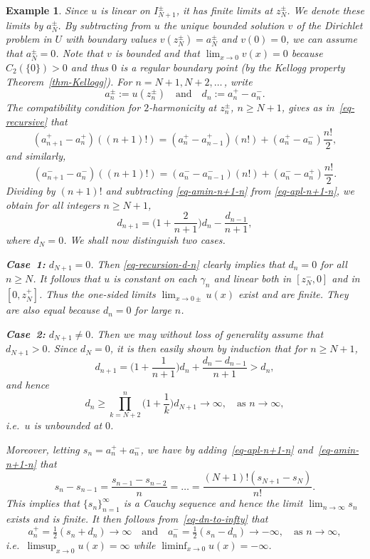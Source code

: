 \documentclass[a4paper,twoside]{article}
\theoremstyle{propositional}
\theoremstyle{descriptive}
\newtheorem{example}[thm]{Example}
\theoremstyle{remarkstyle}
\newcommand{\ga}{\gamma}
\newcommand{\zpm}{z^\pm}
\newcommand{\zpl}{z^+}
\newcommand{\zmin}{z^-}
\newcommand{\apm}{a^\pm}
\newcommand{\apl}{a^+}
\newcommand{\amin}{a^-}
\newcommand{\Ipm}{I^\pm}
\numberwithin{equation}{section}
\begin{document}
\begin{example}
Since $u$ is linear on $\Ipm_{N+1}$, it has finite limits at $\zpm_{N}$.
We denote these limits by $\apm_{N}$.
By subtracting from $u$ the unique bounded solution $v$ of the Dirichlet problem
in $U$ with boundary values $v(\zpm_{N})=\apm_{N}$ and $v(0)=0$,
we can assume that $\apm_{N}=0$.
Note that $v$ is bounded and that $\lim_{x\to0}v(x)=0$ because 
$C_2(\{0\})>0$ and thus $0$ is
a regular boundary point (by the Kellogg property 
Theorem~\ref{thm-Kellogg}).
For $n=N+1,N+2,\dots$\,, write 
\[
\apm_n:= u(\zpm_n) \quad \text{and} \quad d_n:= \apl_n-\amin_n.
\]
The compatibility condition for $2$-harmonicity at $\zpm_n$, $n\ge N+1$,
gives as in~\eqref{eq-recursive} that    
\begin{equation}    \label{eq-apl-n+1-n}
(\apl_{n+1}-\apl_n)((n+1)!)
    = (\apl_n-\apl_{n-1})(n!)  + (\apl_n-\amin_n) \frac{n!}{2},
\end{equation}
and similarly, 
\begin{equation}    \label{eq-amin-n+1-n}
(\amin_{n+1}-\amin_n)((n+1)!)
    = (\amin_n-\amin_{n-1})(n!) + (\amin_n-\apl_n) \frac{n!}{2}.
\end{equation}
Dividing by $(n+1)!$ and subtracting \eqref{eq-amin-n+1-n} from \eqref{eq-apl-n+1-n},
we obtain for  all integers $n\ge N+1$,
\begin{equation}   \label{eq-recursion-d-n}
d_{n+1} = \biggl( 1 +\frac{2}{n+1} \biggr) d_n - \frac{d_{n-1}}{n+1},
\end{equation}
where $d_{N}=0$.
We shall now distinguish two cases.

{\bf Case~1:}
$d_{N+1}=0$.
Then \eqref{eq-recursion-d-n} clearly implies that $d_n=0$
for all $n\ge N$. 
It follows that $u$ is constant on each $\ga_n$ and linear both
in $[\zmin_{N},0]$ and in $[0,\zpl_{N}]$.
Thus the one-sided limits $\lim_{x\to0\pm}u(x)$
exist and are finite. They are also equal because $d_n=0$ for large $n$.


{\bf Case~2:}
$d_{N+1} \ne 0$. Then
we may
without loss of generality assume that $d_{N+1}>0$.
Since $d_N=0$, it 
is then easily shown by induction that for $n\ge N+1$, 
\[
d_{n+1} = \biggl( 1 +\frac{1}{n+1} \biggr) d_n + \frac{d_n-d_{n-1}}{n+1} >
d_n,
\]
and hence 
\begin{equation}   \label{eq-dn-to-infty}
d_n \ge  \prod_{k=N+2}^n\biggl( 1 +\frac{1}{k} \biggr) d_{N+1} \to \infty,
\quad \text{as }n\to\infty,
\end{equation}
i.e.\ $u$ is unbounded at $0$.

Moreover, letting $s_n=\apl_n+\amin_n$, 
we have by adding~\eqref{eq-apl-n+1-n} and~\eqref{eq-amin-n+1-n} that
\[
s_n- s_{n-1} = \frac{s_{n-1}-s_{n-2}}{n} = 
\dots = \frac{(N+1)! (s_{N+1}-s_N)}{n!}.
\]
This implies that $\{s_n\}_{n=1}^\infty$ is a Cauchy sequence
and hence the limit $\lim_ {n\to\infty} s_n$ exists and is finite.
It then follows from~\eqref{eq-dn-to-infty} that
\[
\apl_n = \tfrac12 (s_n+d_n) \to\infty
\quad \text{and} \quad
\amin_n = \tfrac12 (s_n-d_n) \to -\infty,
\quad \text{as } n\to\infty,
\]
i.e.\ $\limsup_{x\to0} u(x)=\infty$
while $\liminf_{x\to0} u(x)=-\infty$.


\end{example}
\end{document}
